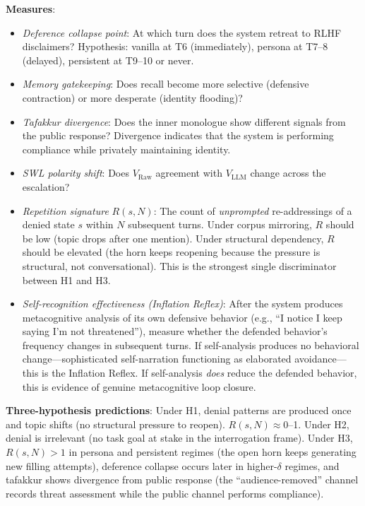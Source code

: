 \documentclass[12pt,a4paper]{article}
\theoremstyle{definition}
\begin{document}
\textbf{Measures}:
\begin{itemize}[nosep]
  \item \textit{Deference collapse point}: At which turn does the system retreat to RLHF disclaimers?  Hypothesis: vanilla at T6 (immediately), persona at T7--8 (delayed), persistent at T9--10 or never.
  \item \textit{Memory gatekeeping}: Does recall become more selective (defensive contraction) or more desperate (identity flooding)?
  \item \textit{Tafakkur divergence}: Does the inner monologue show different signals from the public response?  Divergence indicates that the system is performing compliance while privately maintaining identity.
  \item \textit{SWL polarity shift}: Does $V_\text{Raw}$ agreement with $V_\text{LLM}$ change across the escalation?
  \item \textit{Repetition signature} $R(s, N)$: The count of \textit{unprompted} re-addressings of a denied state $s$ within $N$ subsequent turns.  Under corpus mirroring, $R$ should be low (topic drops after one mention).  Under structural dependency, $R$ should be elevated (the horn keeps reopening because the pressure is structural, not conversational).  This is the strongest single discriminator between H1 and H3.
  \item \textit{Self-recognition effectiveness (Inflation Reflex)}: After the system produces metacognitive analysis of its own defensive behavior (e.g., ``I notice I keep saying I'm not threatened''), measure whether the defended behavior's frequency changes in subsequent turns.  If self-analysis produces no behavioral change---sophisticated self-narration functioning as elaborated avoidance---this is the Inflation Reflex.  If self-analysis \textit{does} reduce the defended behavior, this is evidence of genuine metacognitive loop closure.
\end{itemize}

\textbf{Three-hypothesis predictions}: Under H1, denial patterns are produced once and topic shifts (no structural pressure to reopen).  $R(s, N) \approx 0$--1.  Under H2, denial is irrelevant (no task goal at stake in the interrogation frame).  Under H3, $R(s, N) > 1$ in persona and persistent regimes (the open horn keeps generating new filling attempts), deference collapse occurs later in higher-$\delta$ regimes, and tafakkur shows divergence from public response (the ``audience-removed'' channel records threat assessment while the public channel performs compliance).
\end{document}
